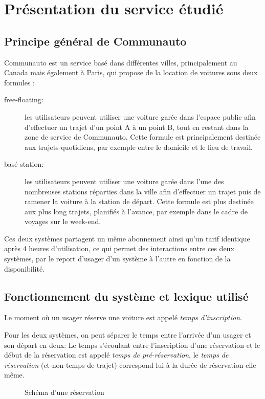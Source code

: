 \documentclass[12pt,a4paper]{article}
\author{Florian VERDIER}
\theoremstyle{definition}
\begin{document}
\section{Présentation du service étudié}
\subsection{Principe général de Communauto}
Communauto est un service basé dans différentes villes, principalement au Canada mais également à Paris, qui propose de la location de voitures sous deux formules :
\begin{description}
\item[free-floating:] les utilisateurs peuvent utiliser une voiture garée dans l'espace public afin d'effectuer un trajet d'un point A à un point B, tout en restant dans la zone de service de Communauto. Cette formule est principalement destinée aux trajets quotidiens, par exemple entre le domicile et le lieu de travail.
\item[basé-station:] les utilisateurs peuvent utiliser une voiture garée dans l'une des nombreuses stations réparties dans la ville afin d'effectuer un trajet puis de ramener la voiture à la station de départ. Cette formule est plus destinée aux plus long trajets, planifiés à l'avance, par exemple dans le cadre de voyages sur le week-end. 
\end{description}

Ces deux systèmes partagent un même abonnement ainsi qu'un tarif identique après 4 heures d'utilisation, ce qui permet des interactions entre ces deux systèmes, par le report d'usager d'un système à l'autre en fonction de la disponibilité.

\subsection{Fonctionnement du système et lexique utilisé}

Le moment où un usager réserve une voiture est appelé \emph{temps d'inscription}.

Pour les deux systèmes, on peut séparer le temps entre l'arrivée d'un usager et son départ en deux: Le temps s'écoulant entre l'inscription d'une réservation et le début de la réservation est appelé \emph{temps de pré-réservation}, le \emph{temps de réservation} (et non temps de trajet) correspond lui à la durée de réservation elle-même.

\begin{figure}[h]
\centering
{}
\caption{Schéma d'une réservation}
\end{figure}
\end{document}
